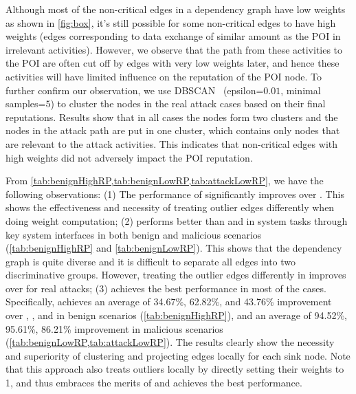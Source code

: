 Although most of the non-critical edges in a dependency graph have low weights as shown in \cref{fig:box}, it's still possible for some non-critical edges to have high weights (\eg edges corresponding to data exchange of similar amount as the POI in irrelevant activities). 
However, we observe that the path from these activities to the POI are often cut off by edges with very low weights later, and hence these activities will have limited influence on the reputation of the POI node. 
To further confirm our observation, we use DBSCAN~\cite{ester1996density} (epsilon=$0.01$, minimal samples=$5$) to cluster the nodes in the real attack cases based on their final reputations. 
Results show that in all cases the nodes form two clusters and the nodes in the attack path are put in one cluster, which contains only nodes that are relevant to the attack activities.
This indicates that non-critical edges with high weights did not adversely impact the POI reputation.

From \cref{tab:benignHighRP,tab:benignLowRP,tab:attackLowRP},
we have the following observations:
(1) The performance of \lpglobalplus significantly improves over \lpglobal.
This shows the effectiveness and necessity of treating outlier edges differently when doing weight computation;
(2) \lpfixed performs better than \lpglobal and \lpglobalplus in system tasks through key system interfaces in both benign and malicious scenarios (\cref{tab:benignHighRP} and \cref{tab:benignLowRP}).
This shows that the dependency graph is quite diverse and it is difficult to separate all edges into two discriminative groups.
However, treating the outlier edges differently in \lpglobalplus improves over \lpfixed for real attacks;
(3) \tool achieves the best performance in most of the cases. Specifically, \tool achieves an average of 34.67\%, 62.82\%, and 43.76\% improvement over \lpfixed, \lpglobal, and \lpglobalplus in benign scenarios (\cref{tab:benignHighRP}), and an average of 94.52\%, 95.61\%, 86.21\% improvement in malicious scenarios (\cref{tab:benignLowRP,tab:attackLowRP}).
The results clearly show the necessity and superiority of clustering and projecting edges locally for each sink node.
Note that this approach also treats outliers locally by directly setting their weights to 1, and thus \tool embraces the merits of \lpglobalplus and achieves the best performance.


